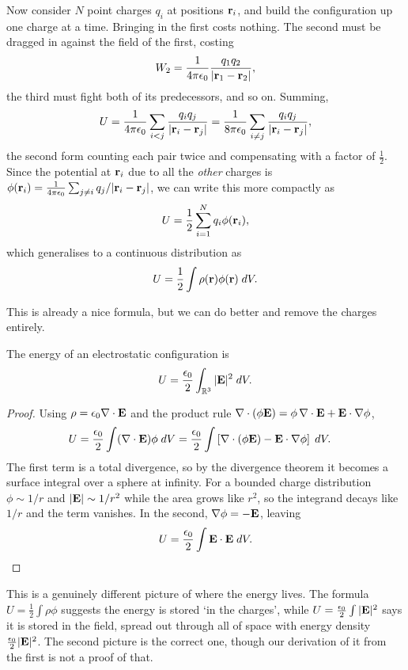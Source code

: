 \documentclass[a4paper]{scrartcl}
\begin{document}
Now consider $N$ point charges $q_i$ at positions $\mathbf{r}_i$, and build the configuration up one charge at a time. Bringing in the first costs nothing. The second must be dragged in against the field of the first, costing
$$
W_2 = \frac{1}{4\pi\epsilon_0}\frac{q_1q_2}{|\mathbf{r}_1-\mathbf{r}_2|},
$$
the third must fight both of its predecessors, and so on. Summing,
$$
U = \frac{1}{4\pi\epsilon_0}\sum_{i<j}\frac{q_iq_j}{|\mathbf{r}_i-\mathbf{r}_j|} = \frac{1}{8\pi\epsilon_0}\sum_{i\neq j}\frac{q_iq_j}{|\mathbf{r}_i-\mathbf{r}_j|},
$$
the second form counting each pair twice and compensating with a factor of $\tfrac12$. Since the potential at $\mathbf{r}_i$ due to all the \emph{other} charges is $\phi(\mathbf{r}_i) = \frac{1}{4\pi\epsilon_0}\sum_{j\neq i} q_j/|\mathbf{r}_i - \mathbf{r}_j|$, we can write this more compactly as
$$
U = \frac{1}{2}\sum_{i=1}^N q_i \phi(\mathbf{r}_i),
$$
which generalises to a continuous distribution as
$$
U = \frac{1}{2}\int \rho(\mathbf{r})\phi(\mathbf{r})\; d V.
$$

This is already a nice formula, but we can do better and remove the charges entirely.

\begin{proposition}
	\label{prop:E-energy}
	The energy of an electrostatic configuration is
	$$
	U = \frac{\epsilon_0}{2}\int_{\mathbb{R}^3} |\mathbf{E}|^2 \; d V.
	$$
\end{proposition}
\begin{proof}
	Using $\rho = \epsilon_0 \nabla \cdot \mathbf{E}$ and the product rule $\nabla\cdot(\phi \mathbf{E}) = \phi\, \nabla\cdot \mathbf{E} + \mathbf{E}\cdot\nabla\phi$,
	\begin{align*}
		U &= \frac{\epsilon_0}{2}\int (\nabla\cdot \mathbf{E})\phi \; d V = \frac{\epsilon_0}{2}\int \left[\nabla\cdot(\phi\mathbf{E}) - \mathbf{E}\cdot \nabla \phi\right]\; d V.
	\end{align*}
	The first term is a total divergence, so by the divergence theorem it becomes a surface integral over a sphere at infinity. For a bounded charge distribution $\phi \sim 1/r$ and $|\mathbf{E}| \sim 1/r^2$ while the area grows like $r^2$, so the integrand decays like $1/r$ and the term vanishes. In the second, $\nabla \phi = -\mathbf{E}$, leaving
	$$
	U = \frac{\epsilon_0}{2}\int \mathbf{E}\cdot \mathbf{E}\; d V. \qedhere
	$$
\end{proof}

This is a genuinely different picture of where the energy lives. The formula $U = \tfrac12 \int \rho\phi$ suggests the energy is stored `in the charges', while $U = \tfrac{\epsilon_0}{2}\int |\mathbf{E}|^2$ says it is stored in the field, spread out through all of space with energy density $\tfrac{\epsilon_0}{2}|\mathbf{E}|^2$. The second picture is the correct one, though our derivation of it from the first is not a proof of that.
\end{document}
